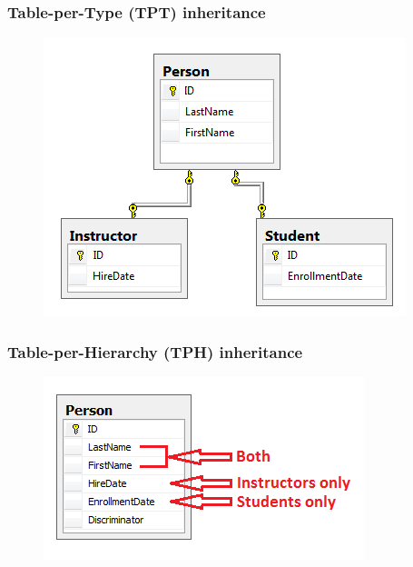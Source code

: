\documentclass{beamer}
\begin{document}
\begin{frame}
	\frametitle{Table-per-Type (TPT) inheritance}
	\begin{figure}
		\centering
		\includegraphics[scale=0.5]{resources/entity-framework/tpt.png}
	\end{figure}
\end{frame}

\begin{frame}
	\frametitle{Table-per-Hierarchy (TPH) inheritance}
	\begin{figure}
		\centering
		\includegraphics[scale=0.8]{resources/entity-framework/tph.png}
	\end{figure}
\end{frame}
\end{document}
